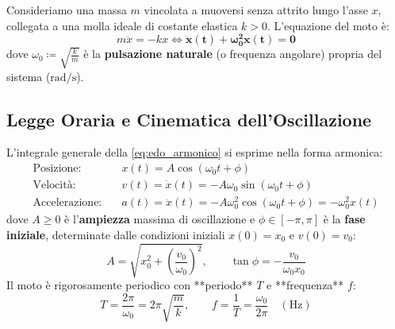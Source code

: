 Consideriamo una massa $m$ vincolata a muoversi senza attrito lungo l'asse $x$, collegata a una molla ideale di costante elastica $k > 0$. L'equazione del moto è:
\begin{equation}
    m\ddot{x} = -kx \iff \mathbf{\ddot{x}(t) + \omega_0^2 x(t) = 0}
    \label{eq:edo_armonico}
\end{equation}
dove $\omega_0 \coloneqq \sqrt{\frac{k}{m}}$ è la \textbf{pulsazione naturale} (o frequenza angolare) propria del sistema ($\si{\radian\per\second}$).

\subsection{Legge Oraria e Cinematica dell'Oscillazione}
L'integrale generale della \eqref{eq:edo_armonico} si esprime nella forma armonica:
\begin{align}
    \text{Posizione:} \quad & x(t) = A \cos(\omega_0 t + \phi) \label{eq:x_armonico} \\
    \text{Velocità:} \quad & v(t) = \dot{x}(t) = -A\omega_0 \sin(\omega_0 t + \phi) \label{eq:v_armonico} \\
    \text{Accelerazione:} \quad & a(t) = \ddot{x}(t) = -A\omega_0^2 \cos(\omega_0 t + \phi) = -\omega_0^2 x(t) \label{eq:a_armonico}
\end{align}
dove $A \ge 0$ è l'\textbf{ampiezza} massima di oscillazione e $\phi \in [-\pi, \pi]$ è la \textbf{fase iniziale}, determinate dalle condizioni iniziali $x(0) = x_0$ e $v(0) = v_0$:
\begin{equation}
    A = \sqrt{x_0^2 + \left(\frac{v_0}{\omega_0}\right)^2}, \qquad \tan\phi = -\frac{v_0}{\omega_0 x_0}
\end{equation}
Il moto è rigorosamente periodico con **periodo** $T$ e **frequenza** $f$:
\begin{equation}
    T = \frac{2\pi}{\omega_0} = 2\pi\sqrt{\frac{m}{k}}, \qquad f = \frac{1}{T} = \frac{\omega_0}{2\pi} \quad (\si{\hertz})
\end{equation}


